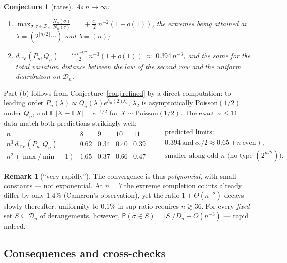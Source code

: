 \documentclass[11pt]{article}
\newtheorem{conjecture}[theorem]{Conjecture}
\theoremstyle{definition}
\newtheorem{remark}[theorem]{Remark}
\newcommand{\dtv}{d_{\mathrm{TV}}}
\newcommand{\E}{\mathbb{E}}
\renewcommand{\Pr}{\mathbb{P}}
\newcommand{\DD}{\mathcal{D}}
\newcommand{\PP}{P}
\newcommand{\QQ}{Q}
\begin{document}
\begin{conjecture}[rates]\label{conj:rates}
As $n\to\infty$:
\begin{enumerate}[label=(\alph*),leftmargin=2em]
\item $\displaystyle
\max_{\sigma,\tau\in\DD_n}\frac{N_n(\sigma)}{N_n(\tau)}
=1+\frac{c_2}{2}\,n^{-2}(1+o(1))$, the extremes being attained at
$\lambda=(2^{\lfloor n/2\rfloor}\cdots)$ and $\lambda=(n)$;
\item $\displaystyle
\dtv(\PP_n,\QQ_n)\;=\;\frac{c_2\,e^{-1/2}}{2}\,n^{-3}(1+o(1))
\;\approx\;0.394\,n^{-3}$,
and the same for the total variation distance between the law of the second
row and the uniform distribution on $\DD_n$.
\end{enumerate}
\end{conjecture}

Part (b) follows from Conjecture~\ref{conj:refined} by a direct computation:
to leading order $\PP_n(\lambda)\propto \QQ_n(\lambda)e^{h_n(2)\lambda_2}$,
$\lambda_2$ is asymptotically Poisson$(1/2)$ under $\QQ_n$, and
$\E\,|X-\E X| = e^{-1/2}$ for $X\sim\mathrm{Poisson}(1/2)$.
The exact $n\le11$ data match both predictions strikingly well:
\[
\begin{array}{l|llll}
n & 8 & 9 & 10 & 11\\\hline
n^3\,\dtv(\PP_n,\QQ_n) & 0.62 & 0.34 & 0.40 & 0.39\\
n^2\,(\max/\min-1) & 1.65 & 0.37 & 0.66 & 0.47
\end{array}
\qquad
\begin{array}{l}
\text{predicted limits:}\\
0.394\ \text{and}\ c_2/2\approx0.65\ (n\ \text{even}),\\
\text{smaller along odd $n$ (no type } (2^{n/2})).
\end{array}
\]

\begin{remark}[``very rapidly'']
The convergence is thus \emph{polynomial}, with small constants --- not
exponential.  At $n=7$ the extreme completion counts already differ by only
$1.4\%$ (Cameron's observation), yet the ratio $1+\Theta(n^{-2})$ decays
slowly thereafter: uniformity to $0.1\%$ in sup-ratio requires $n\gtrsim36$.
For every \emph{fixed} set $S\subseteq\DD_n$ of derangements, however,
$\Pr(\sigma\in S)=|S|/D_n+O(n^{-3})$ --- rapid indeed.
\end{remark}

\subsection{Consequences and cross-checks}\label{sec:consequences}
\end{document}
